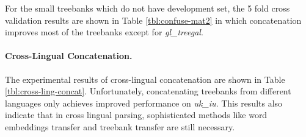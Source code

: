 \documentclass[11pt,a4paper]{article}
\begin{document}
For the small treebanks which do not have development set,
the 5 fold cross validation results are shown in Table \ref{tbl:confuse-mat2}
in which concatenation improves most of the treebanks except for \textit{gl\_treegal}.

\paragraph{Cross-Lingual Concatenation.}

The experimental results of cross-lingual concatenation are shown in Table \ref{tbl:cross-ling-concat}.
Unfortunately, concatenating treebanks from different languages only
achieves improved performance on \textit{uk\_iu}.
This results also indicate that in cross lingual parsing,
sophisticated methods like word embeddings transfer \cite{guo-EtAl:2015:ACL-IJCNLP2} and treebank transfer \cite{C16-1002}
are still necessary.
\end{document}
